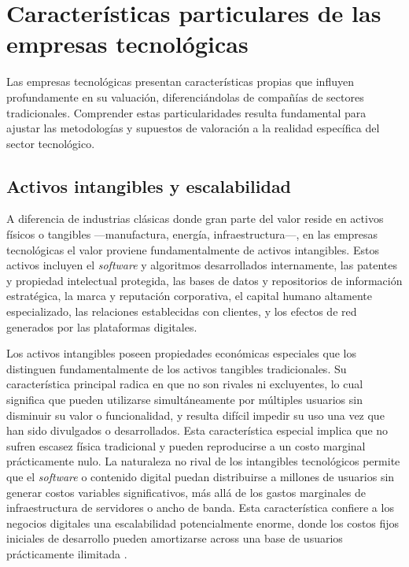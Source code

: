 \section{Características particulares de las empresas tecnológicas}

Las empresas tecnológicas presentan características propias que influyen profundamente en su valuación, diferenciándolas de compañías de sectores tradicionales. Comprender estas particularidades resulta fundamental para ajustar las metodologías y supuestos de valoración a la realidad específica del sector tecnológico.

\subsection{Activos intangibles y escalabilidad}

A diferencia de industrias clásicas donde gran parte del valor reside en activos físicos o tangibles ---manufactura, energía, infraestructura---, en las empresas tecnológicas el valor proviene fundamentalmente de activos intangibles. Estos activos incluyen el \emph{software} y algoritmos desarrollados internamente, las patentes y propiedad intelectual protegida, las bases de datos y repositorios de información estratégica, la marca y reputación corporativa, el capital humano altamente especializado, las relaciones establecidas con clientes, y los efectos de red generados por las plataformas digitales.

Los activos intangibles poseen propiedades económicas especiales que los distinguen fundamentalmente de los activos tangibles tradicionales. Su característica principal radica en que no son rivales ni excluyentes, lo cual significa que pueden utilizarse simultáneamente por múltiples usuarios sin disminuir su valor o funcionalidad, y resulta difícil impedir su uso una vez que han sido divulgados o desarrollados. Esta característica especial implica que no sufren escasez física tradicional y pueden reproducirse a un costo marginal prácticamente nulo. La naturaleza no rival de los intangibles tecnológicos permite que el \emph{software} o contenido digital puedan distribuirse a millones de usuarios sin generar costos variables significativos, más allá de los gastos marginales de infraestructura de servidores o ancho de banda. Esta característica confiere a los negocios digitales una escalabilidad potencialmente enorme, donde los costos fijos iniciales de desarrollo pueden amortizarse across una base de usuarios prácticamente ilimitada \citep{segura2023}.

